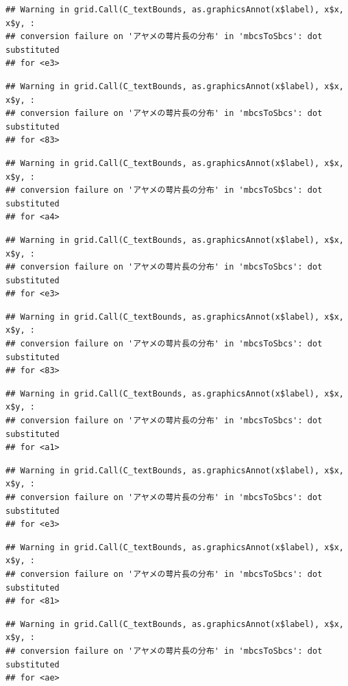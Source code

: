 \documentclass[
]{book}
\begin{document}
\begin{verbatim}
## Warning in grid.Call(C_textBounds, as.graphicsAnnot(x$label), x$x, x$y, :
## conversion failure on 'アヤメの萼片長の分布' in 'mbcsToSbcs': dot substituted
## for <e3>
\end{verbatim}

\begin{verbatim}
## Warning in grid.Call(C_textBounds, as.graphicsAnnot(x$label), x$x, x$y, :
## conversion failure on 'アヤメの萼片長の分布' in 'mbcsToSbcs': dot substituted
## for <83>
\end{verbatim}

\begin{verbatim}
## Warning in grid.Call(C_textBounds, as.graphicsAnnot(x$label), x$x, x$y, :
## conversion failure on 'アヤメの萼片長の分布' in 'mbcsToSbcs': dot substituted
## for <a4>
\end{verbatim}

\begin{verbatim}
## Warning in grid.Call(C_textBounds, as.graphicsAnnot(x$label), x$x, x$y, :
## conversion failure on 'アヤメの萼片長の分布' in 'mbcsToSbcs': dot substituted
## for <e3>
\end{verbatim}

\begin{verbatim}
## Warning in grid.Call(C_textBounds, as.graphicsAnnot(x$label), x$x, x$y, :
## conversion failure on 'アヤメの萼片長の分布' in 'mbcsToSbcs': dot substituted
## for <83>
\end{verbatim}

\begin{verbatim}
## Warning in grid.Call(C_textBounds, as.graphicsAnnot(x$label), x$x, x$y, :
## conversion failure on 'アヤメの萼片長の分布' in 'mbcsToSbcs': dot substituted
## for <a1>
\end{verbatim}

\begin{verbatim}
## Warning in grid.Call(C_textBounds, as.graphicsAnnot(x$label), x$x, x$y, :
## conversion failure on 'アヤメの萼片長の分布' in 'mbcsToSbcs': dot substituted
## for <e3>
\end{verbatim}

\begin{verbatim}
## Warning in grid.Call(C_textBounds, as.graphicsAnnot(x$label), x$x, x$y, :
## conversion failure on 'アヤメの萼片長の分布' in 'mbcsToSbcs': dot substituted
## for <81>
\end{verbatim}

\begin{verbatim}
## Warning in grid.Call(C_textBounds, as.graphicsAnnot(x$label), x$x, x$y, :
## conversion failure on 'アヤメの萼片長の分布' in 'mbcsToSbcs': dot substituted
## for <ae>
\end{verbatim}
\end{document}
